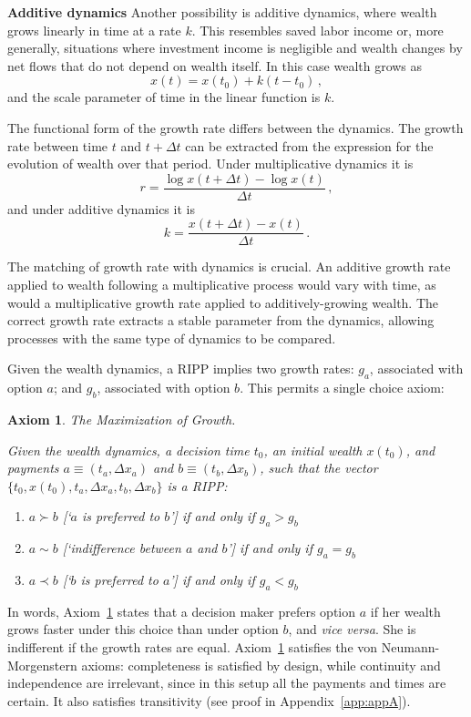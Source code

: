 \documentclass[11pt]{article}
\newtheorem{axiom}{Axiom}
\newcommand{\Aref}[1]{Axiom~\ref{ax:#1}}
\newcommand{\be}{\begin{equation}}
\newcommand{\ee}{\end{equation}}
\newcommand{\Dt}{\Delta t}
\newcommand{\Dx}{\Delta x}
\newcommand{\subhead}[1]{\mbox{}\newline\textbf{#1}\newline}
\numberwithin{equation}{section}
\begin{document}
\subhead{Additive dynamics}
Another possibility is additive dynamics, where wealth grows linearly in time at a rate $k$. This resembles saved labor income or, more generally, situations where investment income is negligible and wealth changes by net flows that do not depend on wealth itself. In this case wealth grows as
%
\be
x\left(t\right) = x\left(t_0\right) + k \left(t - t_0\right)\,,
\ee
%
and the scale parameter of time in the linear function is $k$.

The functional form of the growth rate differs between the dynamics. The growth rate between time $t$ and $t+\Dt$ can be extracted from the expression for the evolution of wealth over that period. Under multiplicative dynamics it is
%
\be
r = \frac{\log x\left(t+\Dt\right)-\log x\left(t\right)}{\Dt}\,,
\ee
%
and under additive dynamics it is
%
\be
k = \frac{x\left(t+\Dt\right) - x\left(t\right)}{\Dt}\,.
\ee
%

The matching of growth rate with dynamics is crucial. An additive growth rate applied to wealth following a multiplicative process would vary with time, as would a multiplicative growth rate applied to additively-growing wealth. The correct growth rate extracts a stable parameter from the dynamics, allowing processes with the same type of dynamics to be compared.

Given the wealth dynamics, a RIPP implies two growth rates: $g_a$, associated with option $a$; and $g_b$, associated with option $b$. This permits a single choice axiom:

\begin{axiom}{The Maximization of Growth.}

Given the wealth dynamics, a decision time $t_0$, an initial wealth $x\left(t_0\right)$, and payments $a\equiv\left(t_a,\Dx_a\right)$ and $b\equiv\left(t_b,\Dx_b\right)$, such that the vector $\{t_0,x\left(t_0\right),t_a,\Dx_a,t_b,\Dx_b\}$ is a RIPP:
%
\begin{enumerate}
\item $a \succ b$ [`$a$ is preferred to $b$'] if and only if $g_a > g_b$ 
\item $a\sim b$ [`indifference between $a$ and $b$'] if and only if $g_a = g_b$
\item $a \prec b$ [`$b$ is preferred to $a$'] if and only if $g_a < g_b$
\end{enumerate}
%
\label{ax:ax1}
\end{axiom}

In words, \Aref{ax1} states that a decision maker prefers option $a$ if her wealth grows faster under this choice than under option $b$, and \textit{vice versa}. She is indifferent if the growth rates are equal. \Aref{ax1} satisfies the von Neumann-Morgenstern axioms: completeness is satisfied by design, while continuity and independence are irrelevant, since in this setup all the payments and times are certain. It also satisfies transitivity (see proof in Appendix~\ref{app:appA}).
\end{document}
